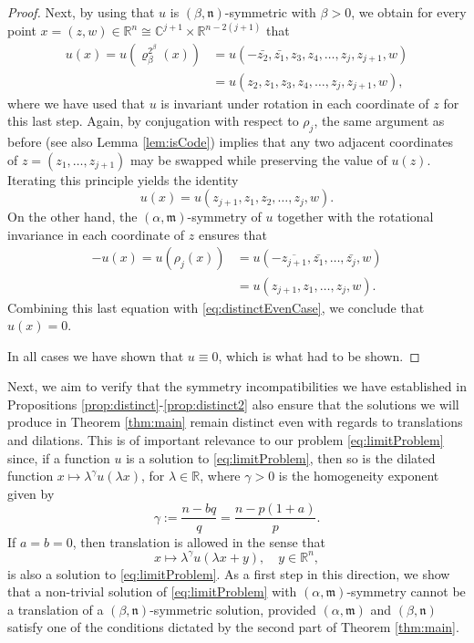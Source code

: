 \documentclass[10pt, reqno]{amsart}
\newcommand{\RR}{\mathbb{R}}
\newcommand{\CC}{\mathbb{C}}
\newcommand{\m}{\mathfrak{m}}
\newcommand{\n}{\mathfrak{n}}
\numberwithin{equation}{section}
\theoremstyle{definition}
\theoremstyle{remark}
\theoremstyle{plain}
\begin{document}
\begin{proof}
		Next, by using that $u$ is $(\beta,\n)$-symmetric with $\beta > 0$, we obtain for every point $x  = (z,w)\in \RR^n \cong \CC^{j+1} \times \RR^{n-2(j+1)}$ that 
		\begin{align*}
			u(x) = u(\varrho_{\beta}^{2^\beta}(x)) &= u(-\bar{z_2}, \bar{z_1}, z_3, z_4, \dots, z_{j}, z_{j+1}, w)\\
			&= u({z_2}, {z_1}, z_3, z_4, \dots, z_{j}, z_{j+1}, w),
		\end{align*}
		where we have used that $u$ is invariant under rotation in each coordinate of $z$ for this last step. Again, by conjugation with respect to $\rho_j$, the same argument as before (see also Lemma \ref{lem:isCode}) implies that any two adjacent coordinates of $z = (z_1,\dots,z_{j+1})$ may be swapped while preserving the value of $u(z)$. Iterating this principle yields the identity
		\begin{equation}\label{eq:distinctEvenCase}
			u(x) = u(z_{j+1}, z_1, z_2, \dots, z_j, w).
		\end{equation}
		On the other hand, the $(\alpha, \m)$-symmetry of $u$ together with the rotational invariance in each coordinate of $z$ ensures that
		\begin{align*}
			-u(x) = u(\rho_j (x)) &= u(-\overline{z_{j+1}}, \bar{z_1}, \dots, \bar{z_j},w)\\
			&=u(z_{j+1}, z_1, \dots, z_j, w).
		\end{align*}
		Combining this last equation with \eqref{eq:distinctEvenCase}, we conclude that $u(x) = 0$. 
		
		In all cases we have shown that $u \equiv 0$, which is what had to be shown.
	\end{proof}
	
	Next, we aim to verify that the symmetry incompatibilities we have established in Propositions \ref{prop:distinct}-\ref{prop:distinct2} also ensure that the solutions we will produce in Theorem \ref{thm:main} remain distinct even with regards to translations and dilations. This is of important relevance to our problem \eqref{eq:limitProblem} since, if a function $u$ is a solution to \eqref{eq:limitProblem}, then so is the dilated function $x \mapsto \lambda^\gamma u(\lambda x)$, for $\lambda \in \RR$, where $\gamma > 0$ is the homogeneity exponent given by
	\begin{equation}\label{eq:exponent}
		\gamma := \frac{n-bq}{q} = \frac{n-p(1+a)}{p}.
	\end{equation}
	If $a=b=0$, then translation is allowed in the sense that
	\[
	x \mapsto \lambda^\gamma u(\lambda x + y), \quad y\in \RR^n,
	\]
	is also a solution to \eqref{eq:limitProblem}. As a first step in this direction, we show that a non-trivial solution of \eqref{eq:limitProblem} with $(\alpha,\m)$-symmetry cannot be a translation of a $(\beta,\n)$-symmetric solution, provided $(\alpha,\m)$ and $(\beta,\n)$ satisfy one of the conditions dictated by the second part of Theorem \ref{thm:main}.
	
\end{document}
